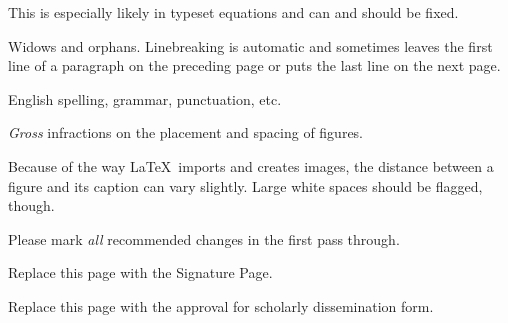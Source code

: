 \documentclass[12pt]{report}
\renewenvironment{itemize}{%
\vspace{-.15in} %
    \begin{olditemize}%
\setlength{\parsep}{0ex}
\setlength{\topsep}{0ex}
\setlength{\partopsep}{0ex}
      \setlength{\parskip}{0pt}%
      \setlength{\itemsep}{0pt}%
  }%
  {%
    \end{olditemize}%
  }
\numberwithin{equation}{chapter}
\begin{document}
\begin{singlespace}
\begin{itemize}
\begin{itemize}
This is especially likely in typeset equations and can and should be
fixed.

\item
Widows and orphans. Linebreaking is automatic and sometimes
leaves the first line of a paragraph on the preceding page or
puts the last line on the next page.

\item
English spelling, grammar, punctuation, etc.

\item
{\em Gross} infractions on the placement and spacing of figures.

Because of the way \LaTeX \ imports and creates images,
the distance between a figure and its caption can vary slightly.
Large white spaces should be flagged, though.

\end{itemize}

\item
Please mark {\em all} recommended changes in the first
pass through.

\end{itemize}

\end{singlespace}


\clearpage

\setcounter{page}{0}

\thispagestyle{empty}



\newpage

\thispagestyle{empty}
Replace this page with the Signature Page.


\newpage





\vfill\vfill
\newpage
\thispagestyle{empty}
Replace this page with the approval for
scholarly dissemination form.


\newpage



\newpage



\end{document}
